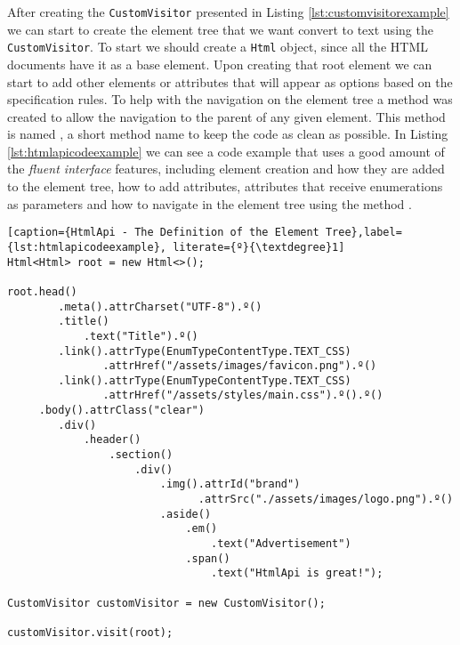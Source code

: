 \noindent
After creating the \texttt{CustomVisitor} presented in Listing \ref{lst:customvisitorexample} we can start to create the element tree that we want convert to text using the \texttt{CustomVisitor}. To start we should create a \texttt{Html} object, since all the \ac{HTML} documents have it as a base element. Upon creating that root element we can start to add other elements or attributes that will appear as options based on the specification rules. To help with the navigation on the element tree a method was created to allow the navigation to the parent of any given element. This method is named \texttt{\textdegree}, a short method name to keep the code as clean as possible. In Listing \ref{lst:htmlapicodeexample} we can see a code example that uses a good amount of the \textit{fluent interface} features, including element creation and how they are added to the element tree, how to add attributes, attributes that receive enumerations as parameters and how to navigate in the element tree using the method \texttt{\textdegree}.

\bigskip


\begin{minipage}{\linewidth}
\begin{lstlisting}[caption={HtmlApi - The Definition of the Element Tree},label={lst:htmlapicodeexample}, literate={º}{\textdegree}1]
Html<Html> root = new Html<>();

root.head()
        .meta().attrCharset("UTF-8").º()
        .title()
            .text("Title").º()
        .link().attrType(EnumTypeContentType.TEXT_CSS)
               .attrHref("/assets/images/favicon.png").º()
        .link().attrType(EnumTypeContentType.TEXT_CSS)
               .attrHref("/assets/styles/main.css").º().º()
     .body().attrClass("clear")
        .div()
            .header()
                .section()
                    .div()
                        .img().attrId("brand")
                              .attrSrc("./assets/images/logo.png").º()
                        .aside()
                            .em()
                                .text("Advertisement")
                            .span()
                                .text("HtmlApi is great!");
                                    
CustomVisitor customVisitor = new CustomVisitor();
    
customVisitor.visit(root);
\end{lstlisting}
\end{minipage}

